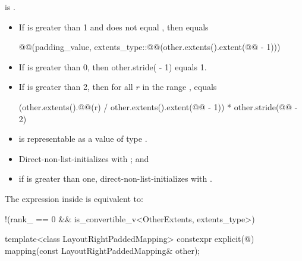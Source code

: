 \begin{itemdescr}
\pnum
\constraints
{} is .

\pnum
\expects
\begin{itemize}
\item
If  is greater than 1 and
 does not equal ,
then  equals
\begin{codeblock}
@@(padding_value,
                        extents_type::@@(other.extents().extent(@@ - 1)))
\end{codeblock}
\item
If  is greater than 0,
then other.stride( - 1) equals 1.
\item
If  is greater than 2,
then for all $r$ in the range ,
 equals
\begin{codeblock}
(other.extents().@@(r) / other.extents().extent(@@ - 1)) *
  other.stride(@@ - 2)
\end{codeblock}
\item
{} is representable as
a value of type .
\end{itemize}

\pnum
\effects
\begin{itemize}
\item
Direct-non-list-initializes  with ; and
\item
if  is greater than one,
direct-non-list-initializes 
with .
\end{itemize}

\pnum
\remarks
The expression inside  is equivalent to:
\begin{codeblock}
!(rank_ == 0 && is_convertible_v<OtherExtents, extents_type>)
\end{codeblock}
\end{itemdescr}

%
\begin{itemdecl}
template<class LayoutRightPaddedMapping>
  constexpr explicit(@\seebelow@)
    mapping(const LayoutRightPaddedMapping& other);
\end{itemdecl}

